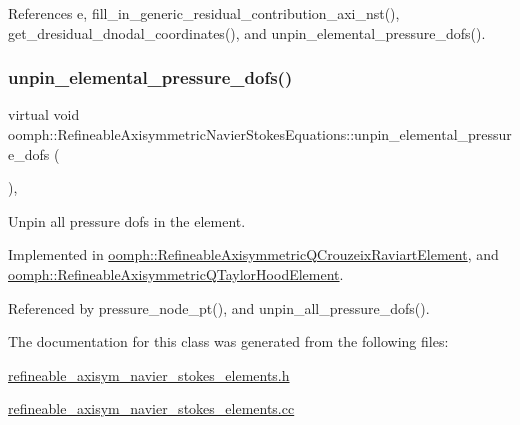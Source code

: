 References e, fill\+\_\+in\+\_\+generic\+\_\+residual\+\_\+contribution\+\_\+axi\+\_\+nst(), get\+\_\+dresidual\+\_\+dnodal\+\_\+coordinates(), and unpin\+\_\+elemental\+\_\+pressure\+\_\+dofs().

\mbox{\label{classoomph_1_1RefineableAxisymmetricNavierStokesEquations_a01009bc617cad72b7467b5e947e7be88}} 
\subsubsection{\texorpdfstring{unpin\+\_\+elemental\+\_\+pressure\+\_\+dofs()}{unpin\_elemental\_pressure\_dofs()}}
{\footnotesize\ttfamily virtual void oomph\+::\+Refineable\+Axisymmetric\+Navier\+Stokes\+Equations\+::unpin\+\_\+elemental\+\_\+pressure\+\_\+dofs (\begin{DoxyParamCaption}{ }\end{DoxyParamCaption})\hspace{0.3cm}{\ttfamily [protected]}, {}}



Unpin all pressure dofs in the element. 



Implemented in \hyperlink{classoomph_1_1RefineableAxisymmetricQCrouzeixRaviartElement_a03db4e96e84be516b30ee13ec075a939}{oomph\+::\+Refineable\+Axisymmetric\+Q\+Crouzeix\+Raviart\+Element}, and \hyperlink{classoomph_1_1RefineableAxisymmetricQTaylorHoodElement_a8f9a8ab37c89caf1460ee47dc667a4f0}{oomph\+::\+Refineable\+Axisymmetric\+Q\+Taylor\+Hood\+Element}.



Referenced by pressure\+\_\+node\+\_\+pt(), and unpin\+\_\+all\+\_\+pressure\+\_\+dofs().



The documentation for this class was generated from the following files\+:\begin{DoxyCompactItemize}
\item 
\hyperlink{refineable__axisym__navier__stokes__elements_8h}{refineable\+\_\+axisym\+\_\+navier\+\_\+stokes\+\_\+elements.\+h}\item 
\hyperlink{refineable__axisym__navier__stokes__elements_8cc}{refineable\+\_\+axisym\+\_\+navier\+\_\+stokes\+\_\+elements.\+cc}\end{DoxyCompactItemize}
